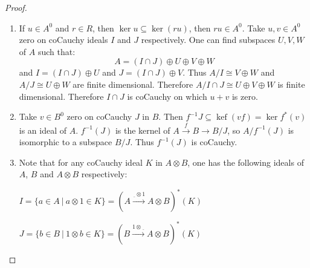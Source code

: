 \documentclass[8pt]{article}
\theoremstyle{definition}
\theoremstyle{definition}
\theoremstyle{definition}
\theoremstyle{definition}
\theoremstyle{definition}
\theoremstyle{definition}
\theoremstyle{definition}
\theoremstyle{definition}
\theoremstyle{definition}
\theoremstyle{definition}
\theoremstyle{definition}
\theoremstyle{definition}
\theoremstyle{definition}
\theoremstyle{definition}
\theoremstyle{question}
\begin{document}
\begin{proof}
  \begin{enumerate}
    \item If $u \in A^0$ and $r \in R$, then $\operatorname{ker} u \subseteq \operatorname{ker}(r u)$,
    then $r u \in A^0$. Take $u, v \in A^0$ zero on coCauchy ideals $I$ and $J$ respectively.
    One can find subspaces $U, V, W$ of $A$ such that:
    \[
    A = (I \cap J) \oplus U \oplus V \oplus W
    \]
    and $I = (I \cap J) \oplus U$ and $J = (I \cap J) \oplus V$.
    Thus $A/I \cong V \oplus W$ and $A/J \cong U \oplus W$ are finite dimensional. Therefore
    $A / I \cap J \cong U \oplus V \oplus W$ is finite dimensional. Therefore $I \cap J$ is coCauchy
    on which $u + v$ is zero.
    \item Take $v \in B^0$ zero on coCauchy $J$ in $B$. Then 
    $f^{-1} J \subseteq \operatorname{kef}(v f) = \operatorname{ker} f^*(v)$ is an ideal of $A$.
    $f^{-1}(J)$ is the kernel of $A \xrightarrow{f} B \to B/J$, so $A/f^{-1}(J)$ is 
    isomorphic to a subspace $B/J$. Thus $f^{-1}(J)$ is coCauchy.
    \item Note that for any coCauchy ideal $K$ in $A \otimes B$, one has the following ideals of $A$, $B$
    and $A \otimes B$ respectively:
    \begin{center}
      $I = \{ a \in A \: | \: a \otimes 1 \in K \} = (A \xrightarrow{\underline{\:\:} \otimes 1} A \otimes B)^*(K)$

      $J = \{ b \in B \: | \: 1 \otimes b \in K \} = (B \xrightarrow{1 \otimes \underline{\:\:}} A \otimes B)^*(K)$


\end{center}
\end{enumerate}
\end{proof}
\end{document}

